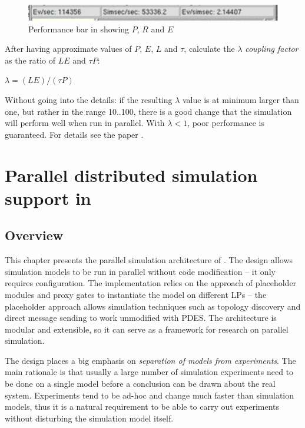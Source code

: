 \begin{figure}[htbp]
  \begin{center}
    \includegraphics{figures/perfbar-screenshot}
    \caption{Performance bar in {\opp} showing $P$, $R$ and $E$}
    \label{fig:perfbar-screenshot}
  \end{center}
\end{figure}

After having approximate values of $P$, $E$, $L$ and $\tau$,
calculate the $\lambda$ \textit{coupling factor} as the ratio of $LE$ and $\tau P$:

$\lambda = (LE) / (\tau P)$

Without going into the details: if the resulting $\lambda$ value is at
minimum larger than one, but rather in the range 10..100, there is
a good change that the simulation will perform well when run in
parallel. With $\lambda < 1$, poor performance is guaranteed.
For details see the paper \cite{ParsimCrit03}.


\section{Parallel distributed simulation support in {\opp}}

\subsection{Overview}

This chapter presents the parallel simulation architecture
of {\opp}. The design allows simulation models to be run
in parallel without code modification -- it only requires configuration.
The implementation relies on the approach of placeholder modules
and proxy gates to instantiate the model on different LPs --
the placeholder approach allows simulation techniques such as
topology discovery and direct message sending to work unmodified with
PDES. The architecture is modular and extensible, so it can
serve as a framework for research on parallel simulation.

The {\opp} design places a big emphasis on
\textit{separation of models from experiments}. The main rationale
is that usually a large number of simulation experiments need to be done
on a single model before a conclusion can be drawn about the real system.
Experiments tend to be ad-hoc and change much faster than simulation
models, thus it is a natural requirement to be able to
carry out experiments without disturbing the simulation model itself.

